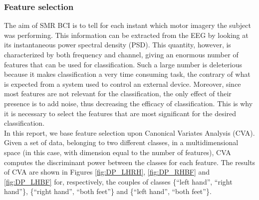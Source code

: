 \subsubsection{Feature selection}
The aim of SMR BCI is to tell for each instant which motor imagery the subject was performing.
This information can be extracted from the EEG by looking at its instantaneous power spectral density (PSD).
This quantity, however, is characterized by both frequency and channel, giving an enormous number of features that can be used for classification.
Such a large number is deleterious because it makes classification a very time consuming task, the contrary of what is expected from a system used to control an external device.
Moreover, since most features are not relevant for the classification, the only effect of their presence is to add noise, thus decreasing the efficacy of classification.
This is why it is necessary to select the features that are most significant for the desired classification. \\
In this report, we base feature selection upon Canonical Variates Analysis (CVA).
Given a set of data, belonging to two different classes, in a multidimensional space (in this case, with dimension equal to the number of features), CVA computes the discriminant power between the classes for each feature.
The results of CVA are shown in Figures \ref{fig:DP_LHRH}, \ref{fig:DP_RHBF} and \ref{fig:DP_LHBF} for, respectively, the couples of classes \{``left hand'', ``right hand''\}, \{``right hand'', ``both feet''\} and \{``left hand'', ``both feet''\}.
